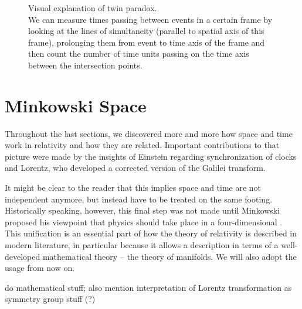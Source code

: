 {\begin{figure}
	\caption{Visual explanation of twin paradox.\\
	We can measure times passing between events in a certain frame by looking at the lines of simultaneity (parallel to spatial axis of this frame), prolonging them from event to time axis of the frame and then count the number of time units passing on the time axis between the intersection points.}
	\label{fig:twin_paradox_doubleprime}
\end{figure}

}
\fi



\newpage



	\section{Minkowski Space}
Throughout the last sections, we discovered more and more how space and time work in relativity and how they are related. Important contributions to that picture were made by the insights of Einstein regarding synchronization of clocks and Lorentz, who developed a corrected version of the Galilei transform.

It might be clear to the reader that this implies space and time are not independent anymore, but instead have to be treated on the same footing. Historically speaking, however, this final step was not made until Minkowski proposed his viewpoint that physics should take place in a four-dimensional . This unification is an essential part of how the theory of relativity is described in modern literature, in particular because it allows a description in terms of a well-developed mathematical theory -- the theory of manifolds. We will also adopt the usage from now on.




do mathematical stuff; also mention interpretation of Lorentz transformation as symmetry group stuff (?)





